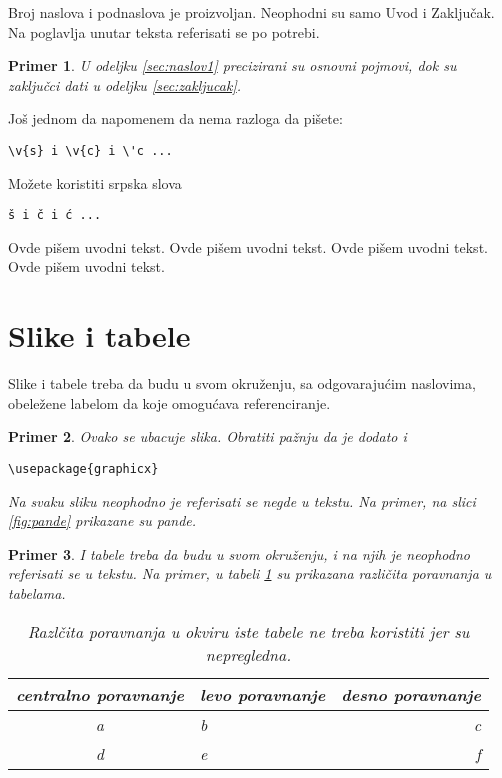 \documentclass[a4paper]{article}
\newtheorem{primer}{Primer}[section]
\begin{document}
{Broj naslova i podnaslova je proizvoljan. Neophodni su samo Uvod i Zaključak. Na poglavlja unutar teksta referisati se po potrebi. 
\begin{primer}
U odeljku \ref{sec:naslov1} precizirani su osnovni pojmovi, dok su zaključci dati u odeljku \ref{sec:zakljucak}.
\end{primer}

Još jednom da napomenem da nema razloga da pišete:
\begin{verbatim}
\v{s} i \v{c} i \'c ...
\end{verbatim}
Možete koristiti srpska slova
\begin{verbatim}
š i č i ć ... 
\end{verbatim}


Ovde pišem uvodni tekst.
Ovde pišem uvodni tekst. 
Ovde pišem uvodni tekst. 
Ovde pišem uvodni tekst. 


\section{Slike i tabele}
\label{slike_i_tabele}

Slike i tabele treba da budu u svom okruženju, sa odgovarajućim naslovima, obeležene labelom da koje omogućava referenciranje. 

\begin{primer} Ovako se ubacuje slika. Obratiti pažnju da je dodato i 
\begin{verbatim}
\usepackage{graphicx}
\end{verbatim}


Na svaku sliku neophodno je referisati se negde u tekstu. Na primer, na slici \ref{fig:pande} prikazane su pande. 
\end{primer}

\begin{primer} I tabele treba da budu u svom okruženju, i na njih je neophodno referisati se u tekstu. Na primer, u tabeli \ref{tab:tabela1} su prikazana različita poravnanja u tabelama.

\begin{table}[h!]
\begin{center}
\caption{Razlčita poravnanja u okviru iste tabele ne treba koristiti jer su nepregledna.}
\begin{tabular}{|c|l|r|} \hline
centralno poravnanje& levo poravnanje& desno poravnanje\\ \hline
a &b&c\\ \hline
d &e&f\\ \hline
\end{tabular}
\label{tab:tabela1}
\end{center}
\end{table}


\end{primer}}
\end{document}
